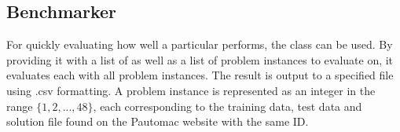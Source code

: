 \subsection{Benchmarker}
For quickly evaluating how well a particular  performs, the  class can be used. By providing it with a list of  as well as a list of problem instances to evaluate on, it evaluates each  with all problem instances. The result is output to a specified file using .csv formatting. A problem instance is represented as an integer in the range $\{1, 2, ..., 48\}$, each corresponding to the training data, test data and solution file found on the Pautomac website with the same ID.